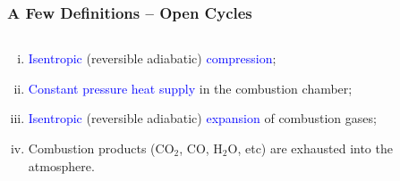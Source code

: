 \documentclass[10pt,compress]{beamer}
\newcommand{\blue}{\textcolor{blue}}
\begin{document}
\begin{frame}
 \frametitle{A Few Definitions -- Open Cycles}
 \scriptsize
 \begin{columns}
  \begin{column}[c]{0.5\linewidth}
    \vspace{-.5cm}
     \begin{enumerate}[(i)]\scriptsize
      \item<2-> \blue{Isentropic} (reversible adiabatic) \blue{compression};
      \item<3-> \blue{Constant pressure heat supply} in the combustion chamber;
      \item<4-> \blue{Isentropic} (reversible adiabatic) \blue{expansion} of combustion gases;
      \item<5-> Combustion products (CO$_{2}$, CO, H$_{2}$O, etc) are exhausted into the atmosphere.
     \end{enumerate}
  \end{column}  
  \begin{column}[c]{0.5\linewidth}
\end{column}
\end{columns}
\end{frame}
\end{document}
